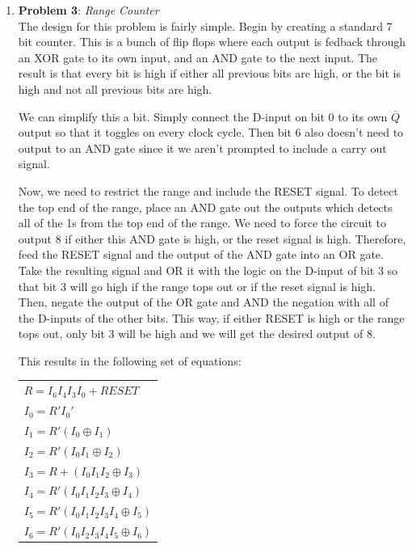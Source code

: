 \documentclass{article}
\begin{document}
\begin{enumerate}
        \item \textbf{Problem 3}: \emph{Range Counter} \\
        
        The design for this problem is fairly simple. Begin by creating a
        standard 7 bit counter. This is a bunch of flip flops where each output
        is fedback through an XOR gate to its own input, and an AND gate to the
        next input. The result is that every bit is high if either all previous
        bits are high, or the bit is high and not all previous bits are high.

        We can simplify this a bit. Simply connect the D-input on bit 0 to its
        own $\overline{Q}$ output so that it toggles on every clock cycle. Then
        bit 6 also doesn't need to output to an AND gate since it we aren't
        prompted to include a carry out signal. 

        Now, we need to restrict the range and include the RESET signal. To
        detect the top end of the range, place an AND gate out the outputs which
        detects all of the 1s from the top end of the range. We
        need to force the circuit to output 8 if either this AND gate is high,
        or the reset signal is high. Therefore, feed the RESET signal and the
        output of the AND gate into an OR gate. Take the resulting signal and
        OR it with the logic on the D-input of bit 3 so that bit 3 will go high
        if the range tops out or if the reset signal is high. Then, negate the 
        output of the OR gate and AND the negation with all of the D-inputs of 
        the other bits. This way, if either RESET is high or the range tops out,
        only bit 3 will be high and we will get the desired output of 8.

        This results in the following set of equations:

        \begin{tabular}{|l|}
            \hline
            $R = I_6I_4I_3I_0 + RESET$ \\
            $I_0 = R'I_0'$ \\
            $I_1 = R'(I_0 \oplus I_1)$ \\
            $I_2 = R'(I_0I_1 \oplus I_2)$ \\
            $I_3 = R + (I_0I_1I_2 \oplus I_3)$ \\
            $I_4 = R'(I_0I_1I_2I_3 \oplus I_4)$ \\
            $I_5 = R'(I_0I_1I_2I_3I_4 \oplus I_5)$ \\
            $I_6 = R'(I_0I_2I_3I_4I_5 \oplus I_6)$ \\
            \hline
        \end{tabular}


\end{enumerate}
\end{document}
